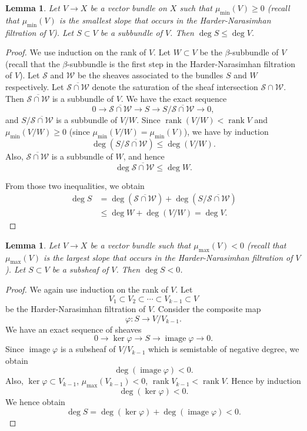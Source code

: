 \documentclass[12pt]{article}
\newtheorem{lemma}[proposition]{Lemma}
\begin{document}
\begin{lemma}\label{lem:3.2}
Let $V \to X$ be a vector bundle on $X$ such that $\mu_{\min}(V) \geq 0$ (recall that $\mu_{\min}(V)$ is the smallest slope that occurs in the Harder-Narasimhan filtration of $V$). Let $S \subset V$ be a subbundle of $V$. Then $\deg S \leq \deg V$.
\end{lemma}
\begin{proof}
We use induction on the rank of $V$. Let $W \subset V$ be the $\beta$-subbundle of $V$ (recall that the $\beta$-subbundle is the first step in the Harder-Narasimhan filtration of $V$). Let $\mathcal{S}$ and $\mathcal{W}$ be the sheaves associated to the bundles $S$ and $W$ respectively. Let $\overline{\mathcal{S} \cap \mathcal{W}}$ denote the saturation of the sheaf intersection $\mathcal{S} \cap \mathcal{W}$. Then $\overline{\mathcal{S} \cap \mathcal{W}}$ is a subbundle of $V$. We have the exact sequence
\[
0 \to \overline{\mathcal{S} \cap \mathcal{W}} \to S \to S / \overline{\mathcal{S} \cap \mathcal{W}} \to 0,
\]
and $S / \overline{\mathcal{S} \cap \mathcal{W}}$ is a subbundle of $V/W$. Since $\operatorname{rank}(V/W) < \operatorname{rank} V$ and $\mu_{\min}(V/W) \geq 0$ (since $\mu_{\min}(V/W) = \mu_{\min}(V)$), we have by induction
\[
\deg(S / \overline{\mathcal{S} \cap \mathcal{W}}) \leq \deg(V/W).
\]
Also, $\overline{\mathcal{S} \cap \mathcal{W}}$ is a subbundle of $W$, and hence
\[
\deg \overline{\mathcal{S} \cap \mathcal{W}} \leq \deg W.
\]

From those two inequalities, we obtain
\begin{align*}
\deg S &= \deg(\overline{\mathcal{S} \cap \mathcal{W}}) + \deg(S / \overline{\mathcal{S} \cap \mathcal{W}}) \\
&\leq \deg W + \deg(V / W) = \deg V.
\end{align*}
\end{proof}


\begin{lemma}\label{lem:3.3}
Let $V \to X$ be a vector bundle such that $\mu_{\max}(V) < 0$ (recall that $\mu_{\max}(V)$ is the largest slope that occurs in the Harder-Narasimhan filtration of $V$). Let $S \subset V$ be a subsheaf of $V$. Then $\deg S < 0$.
\end{lemma}
\begin{proof}
We again use induction on the rank of $V$. Let
\[
V_1 \subset V_2 \subset \cdots \subset V_{k-1} \subset V
\]
be the Harder-Narasimhan filtration of $V$. Consider the composite map
\[
\varphi: S \to V / V_{k-1}.
\]
We have an exact sequence of sheaves
\[
0 \to \ker \varphi \to S \to \operatorname{image} \varphi \to 0.
\]
Since $\operatorname{image} \varphi$ is a subsheaf of $V / V_{k-1}$ which is semistable of negative degree, we obtain
\[
\deg(\operatorname{image} \varphi) < 0.
\]
Also, $\ker \varphi \subset V_{k-1}$, $\mu_{\max}(V_{k-1}) < 0$, $\operatorname{rank} V_{k-1} < \operatorname{rank} V$. Hence by induction
\[
\deg(\ker \varphi) < 0.
\]
We hence obtain
\[
\deg S = \deg(\ker \varphi) + \deg(\operatorname{image} \varphi) < 0.
\]
\end{proof}
\end{document}
